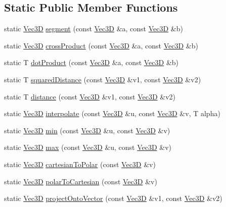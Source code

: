 \subsection*{Static Public Member Functions}
\begin{DoxyCompactItemize}
\item 
static \hyperlink{class_vec3_d}{Vec3D} \hyperlink{class_vec3_d_abc93ae5f29e66aee988f065d7c311ee5}{segment} (const \hyperlink{class_vec3_d}{Vec3D} \&a, const \hyperlink{class_vec3_d}{Vec3D} \&b)
\item 
static \hyperlink{class_vec3_d}{Vec3D} \hyperlink{class_vec3_d_a808067187daf7e7f875c93a16c0dc526}{crossProduct} (const \hyperlink{class_vec3_d}{Vec3D} \&a, const \hyperlink{class_vec3_d}{Vec3D} \&b)
\item 
static T \hyperlink{class_vec3_d_a0b5bcd8c4751c8eab79b83f960e732cb}{dotProduct} (const \hyperlink{class_vec3_d}{Vec3D} \&a, const \hyperlink{class_vec3_d}{Vec3D} \&b)
\item 
static T \hyperlink{class_vec3_d_a1393ee4d8854ffa980e5ab3c76647d56}{squaredDistance} (const \hyperlink{class_vec3_d}{Vec3D} \&v1, const \hyperlink{class_vec3_d}{Vec3D} \&v2)
\item 
static T \hyperlink{class_vec3_d_abab85e2faa41780ceb53b13c6d866d8f}{distance} (const \hyperlink{class_vec3_d}{Vec3D} \&v1, const \hyperlink{class_vec3_d}{Vec3D} \&v2)
\item 
static \hyperlink{class_vec3_d}{Vec3D} \hyperlink{class_vec3_d_a3acfa8bebd1fde147137d88c279bd68e}{interpolate} (const \hyperlink{class_vec3_d}{Vec3D} \&u, const \hyperlink{class_vec3_d}{Vec3D} \&v, T alpha)
\item 
static \hyperlink{class_vec3_d}{Vec3D} \hyperlink{class_vec3_d_ad66b357170a809914269453c86d4246b}{min} (const \hyperlink{class_vec3_d}{Vec3D} \&u, const \hyperlink{class_vec3_d}{Vec3D} \&v)
\item 
static \hyperlink{class_vec3_d}{Vec3D} \hyperlink{class_vec3_d_af1ceabd1161a6b3aa7894d8a09948691}{max} (const \hyperlink{class_vec3_d}{Vec3D} \&u, const \hyperlink{class_vec3_d}{Vec3D} \&v)
\item 
static \hyperlink{class_vec3_d}{Vec3D} \hyperlink{class_vec3_d_a9e230f0533ac66d754006f449d20b75c}{cartesianToPolar} (const \hyperlink{class_vec3_d}{Vec3D} \&v)
\item 
static \hyperlink{class_vec3_d}{Vec3D} \hyperlink{class_vec3_d_a21139d1b8165e623728a0978f8b5aa74}{polarToCartesian} (const \hyperlink{class_vec3_d}{Vec3D} \&v)
\item 
static \hyperlink{class_vec3_d}{Vec3D} \hyperlink{class_vec3_d_a855e0f40632837e720a88c0a2d5f420a}{projectOntoVector} (const \hyperlink{class_vec3_d}{Vec3D} \&v1, const \hyperlink{class_vec3_d}{Vec3D} \&v2)
\end{DoxyCompactItemize}
